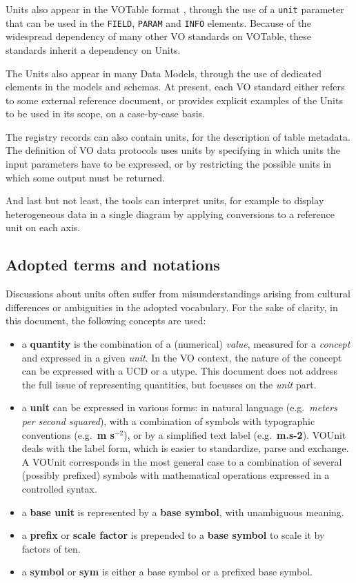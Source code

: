 \documentclass[12pt,notitlepage,onecolumn]{ivoa}
\def\eg{e.g.~}
\newcommand{\unit}[1]{\textbf{\textsf{\color{orange}#1}}}
\begin{document}
Units also appear in the VOTable format \citep{ochsenbein11}, through the use
of a {\tt unit} parameter that can be used in the {\tt FIELD}, {\tt PARAM} and {\tt INFO} 
elements. Because of the widespread dependency of many other VO standards on VOTable,
these standards inherit a dependency on Units.

The Units also appear in many Data Models, through the use of dedicated elements in
the models and schemas.
At present, each VO standard either refers to some external reference document, or 
provides explicit examples of the Units to be used in its scope, on a case-by-case
basis.

The registry records can also contain units, for the description of table metadata.
The definition of VO data protocols uses units by specifying in which units the input
parameters have to be expressed, or by restricting the possible units in which some 
output must be returned.

And last but not least, the tools can interpret units, for example to display
heterogeneous data in a single diagram by applying conversions to a reference 
unit on each axis.

\subsection{Adopted terms and notations\label{sec:notations}}

Discussions about units often suffer from misunderstandings arising from cultural
differences or ambiguities in the adopted vocabulary. For the sake of clarity, in this 
document, the following concepts are used:

\begin{itemize}
\item a {\bf quantity} is the combination of a (numerical) {\em value}, measured for a {\em concept} and expressed in a given {\em unit}. 
In the VO context, the nature of the concept can be expressed with a UCD or a utype. This document does not address the full issue of
representing quantities, but focusses on the {\em unit} part.
\item a {\bf unit} can be expressed in various forms: in natural language (\eg \emph{meters per second squared}), with a combination
of symbols with typographic conventions (\eg \unit{m s$^{-2}$}), or by a simplified text label (\eg \unit{m.s-2}). VOUnit deals with the
label form, which is easier to standardize, parse and exchange. A VOUnit corresponds in the most general case to a combination of
several (possibly prefixed) symbols with mathematical operations expressed in a controlled syntax.
\item a {\bf base unit} is represented by a {\bf base symbol}, with unambiguous meaning.
\item a {\bf prefix} or {\bf scale factor} is prepended to a {\bf base symbol} to scale it by factors of ten.
\item a {\bf symbol} or \unit{sym} is either a base symbol or a prefixed base symbol.
\end{itemize}
\end{document}

